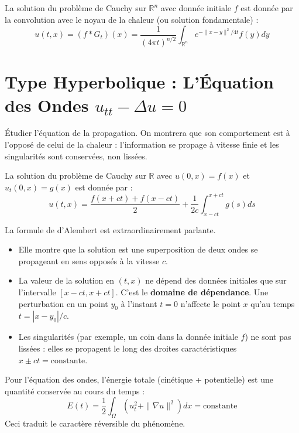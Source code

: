 \begin{theorem}
    La solution du problème de Cauchy sur $\mathbb{R}^n$ avec donnée initiale $f$ est donnée par la convolution avec le noyau de la chaleur (ou solution fondamentale) :
    $$ u(t,x) = (f * G_t)(x) = \frac{1}{(4\pi t)^{n/2}} \int_{\mathbb{R}^n} e^{-\|x-y\|^2/4t} f(y) dy $$
\end{theorem}

\section{Type Hyperbolique : L'Équation des Ondes $u_{tt} - \Delta u = 0$}

\begin{objectif}
    Étudier l'équation de la propagation. On montrera que son comportement est à l'opposé de celui de la chaleur : l'information se propage à vitesse finie et les singularités sont conservées, non lissées.
\end{objectif}

\begin{theorem}
    La solution du problème de Cauchy sur $\mathbb{R}$ avec $u(0,x)=f(x)$ et $u_t(0,x)=g(x)$ est donnée par :
    $$ u(t,x) = \frac{f(x+ct) + f(x-ct)}{2} + \frac{1}{2c}\int_{x-ct}^{x+ct} g(s)ds $$
\end{theorem}

\begin{remark}
    La formule de d'Alembert est extraordinairement parlante.
    \begin{itemize}
        \item Elle montre que la solution est une superposition de deux ondes se propageant en sens opposés à la vitesse $c$.
        \item La valeur de la solution en $(t,x)$ ne dépend des données initiales que sur l'intervalle $[x-ct, x+ct]$. C'est le \textbf{domaine de dépendance}. Une perturbation en un point $y_0$ à l'instant $t=0$ n'affecte le point $x$ qu'au temps $t = |x-y_0|/c$.
        \item Les singularités (par exemple, un coin dans la donnée initiale $f$) ne sont pas lissées : elles se propagent le long des droites caractéristiques $x \pm ct = \text{constante}$.
    \end{itemize}
\end{remark}

\begin{proposition}
    Pour l'équation des ondes, l'énergie totale (cinétique + potentielle) est une quantité conservée au cours du temps :
    $$ E(t) = \frac{1}{2} \int_\Omega (u_t^2 + \|\nabla u\|^2) dx = \text{constante} $$
    Ceci traduit le caractère réversible du phénomène.
\end{proposition}

